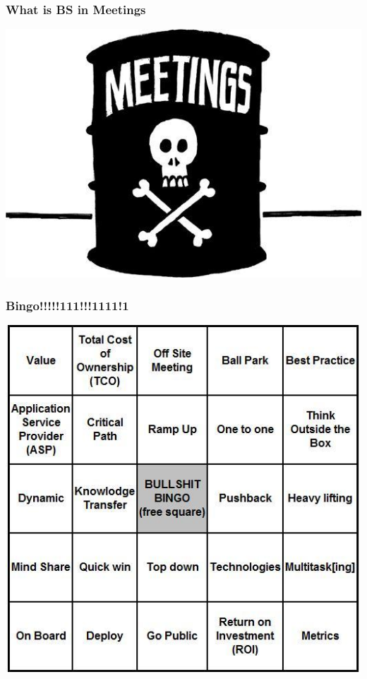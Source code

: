\documentclass[a4paper]{beamer}
\begin{document}
\begin{frame}
\frametitle{What is BS in Meetings}
\begin{center}
\includegraphics[scale=0.60]{img/Image-00047.jpeg}
\end{center}
\end{frame}

\begin{frame}
\frametitle{Bingo!!!!!111!!!1111!1} 
\begin{center}
\includegraphics[scale=0.60]{img/bullshit20bingo1.jpg}
\end{center}
\end{frame}
\end{document}
